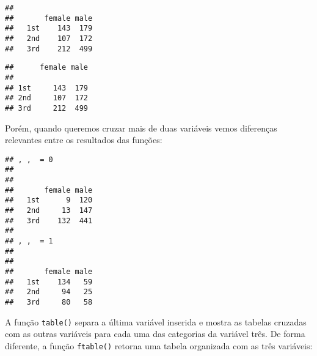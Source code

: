 \documentclass[]{book}
\newenvironment{Shaded}{\begin{snugshade}}{\end{snugshade}}
\newcommand{\KeywordTok}[1]{\textcolor[rgb]{0.13,0.29,0.53}{\textbf{#1}}}
\newcommand{\NormalTok}[1]{#1}
\newcommand{\OperatorTok}[1]{\textcolor[rgb]{0.81,0.36,0.00}{\textbf{#1}}}
\newcommand{\StringTok}[1]{\textcolor[rgb]{0.31,0.60,0.02}{#1}}
\theoremstyle{definition}
\theoremstyle{definition}
\theoremstyle{definition}
\theoremstyle{remark}
\begin{document}
\begin{Shaded}
\end{Shaded}

\begin{verbatim}
##      
##       female male
##   1st    143  179
##   2nd    107  172
##   3rd    212  499
\end{verbatim}

\begin{Shaded}
\end{Shaded}

\begin{verbatim}
##      female male
##                 
## 1st     143  179
## 2nd     107  172
## 3rd     212  499
\end{verbatim}

Porém, quando queremos cruzar mais de duas variáveis vemos diferenças relevantes entre os resultados das funções:

\begin{Shaded}
\end{Shaded}

\begin{verbatim}
## , ,  = 0
## 
##      
##       female male
##   1st      9  120
##   2nd     13  147
##   3rd    132  441
## 
## , ,  = 1
## 
##      
##       female male
##   1st    134   59
##   2nd     94   25
##   3rd     80   58
\end{verbatim}

A função \texttt{table()} separa a última variável inserida e mostra as tabelas cruzadas com as outras variáveis para cada uma das categorias da variável três. De forma diferente, a função \texttt{ftable()} retorna uma tabela organizada com as três variáveis:

\begin{Shaded}
\end{Shaded}
\end{document}
